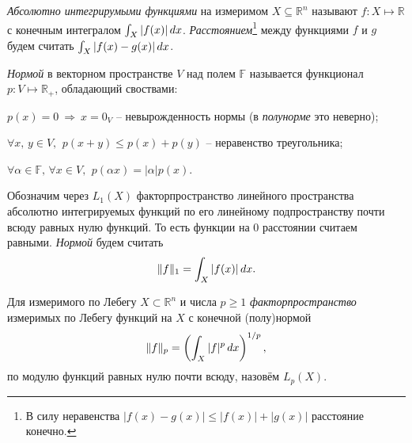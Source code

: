 
\begin{to_def}
    \textit{Абсолютно интегрирумыми функциями} на измеримом $X \subseteq \mathbb{R}^n$ называют $f \colon X \mapsto \mathbb{R}$ с конечным интегралом $\int_X |f(x)| \, d x$. \textit{Расстоянием}\footnote{
        В силу неравенства $|f(x) - g(x)| \leq |f(x)| + |g(x)|$ расстояние конечно.
    } между функциями $f$ и $g$ будем считать $\int_X |f(x)-g(x)| \, d x$.
\end{to_def}

\begin{to_def}
    \textit{Нормой} в векторном пространстве $V$ над полем $\mathbb{F}$ называется функционал $p \colon  V \mapsto \mathbb{R}_+$, обладающий своствами: \vspace{-3mm}
    \begin{enumerate*}
        \item $p(x) = 0 \ \Rightarrow \ x = 0_V$ -- невырожденность нормы (в \textit{полунорме} это неверно);
        \item $\forall x,\, y \in V,\, \ p(x + y) \leq p(x) + p(y)$ -- неравенство треугольника;
        \item $\forall  \alpha \in \mathbb{F},\, \forall x \in V,\,\ p(\alpha x) = |\alpha| p(x)$. 
    \end{enumerate*}
\end{to_def}

\begin{to_def}
    Обозначим через $L_1 (X)$ факторпространство  линейного пространства абсолютно интегрируемых функций по его линейному подпространству почти всюду равных нулю функций. То есть функции на $0$ расстоянии считаем равными. \textit{Нормой} будем считать
    \begin{equation*}
        \|f\|_1 = \int_X |f(x)| \, d x.
    \end{equation*}
\end{to_def}

\begin{to_def}
    Для измеримого по Лебегу $X \subset \mathbb{R}^n$ и числа $p \geq 1$ \textit{факторпространство} измеримых по Лебегу функций на $X$ с конечной (полу)нормой
    \begin{equation*}
        \|f\|_p
        = 
        \left(
            \int_X |f|^p \, d x
        \right)^{1/p},
    \end{equation*}
    по модулю функций равных нулю почти всюду,
    назовём $L_p (X)$.
\end{to_def}



